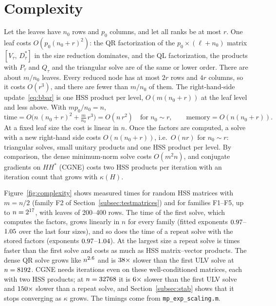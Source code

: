 \section{Complexity}\label{sec:complexity}
Let the leaves have $n_0$ rows and $p_0$ columns, and let all ranks be at most $r$. One leaf costs
$O(p_0(n_0+r)^2)$: the QR factorization of the $p_0\times(\ell+n_0)$ matrix $[V_\tau,\,D_\tau^*]$ in the
size reduction dominates, and the QL factorization, the products with $P_\tau$ and $Q_\tau$ and the
triangular solve are of the same or lower order. There are about $m/n_0$ leaves. Every reduced node has
at most $2r$ rows and $4r$ columns, so it costs $O(r^3)$, and there are fewer than $m/n_0$ of them.
The right-hand-side update~\eqref{eq:bbar} is one HSS product per level, $O(m(n_0+r))$ at the leaf level
and less above. With $mp_0/n_0=n$,
\[
\text{time}=O\!\Big(n\,(n_0+r)^2+\tfrac{m}{n_0}\,r^3\Big)=O(n\,r^2)\quad\text{for }n_0\sim r,
\qquad \text{memory}=O(n(n_0+r)).
\]
At a fixed leaf size the cost is linear in $n$. Once the factors are computed, a solve with a new
right-hand side costs $O(n(n_0+r))$, i.e.\ $O(nr)$ for $n_0\sim r$: triangular solves, small unitary
products and one HSS product per level. By comparison, the dense minimum-norm solve costs $O(m^2n)$,
and conjugate gradients on $HH^*$ (CGNE) costs two HSS products per iteration with an iteration count
that grows with $\kappa(H)$.

Figure~\ref{fig:complexity} shows measured times for random HSS matrices with $m=n/2$ (family F2 of
Section~\ref{subsec:testmatrices}) and for families F1--F5, up to $n=2^{17}$, with leaves of 200--400
rows. The time of the first solve, which computes the factors, grows linearly
in $n$ for every family (fitted exponents $0.97$--$1.05$ over the last four sizes), and so
does the time of a repeat solve with the stored factors (exponents
$0.97$--$1.04$). At the largest size a repeat solve is \EfourRatioRepeat{}
times faster than the first solve and costs as much as \EfourRepeatMatvec{} HSS matrix--vector products.
The dense QR solve grows like $n^{2.6}$ and is $38\times$ slower than the first ULV
solve at $n=8192$. CGNE needs \EfourCgIts{} iterations even on these well-conditioned matrices, each
with two HSS products; at $n=32768$ it is $6\times$ slower than the first ULV solve and
$150\times$ slower than a repeat solve, and Section~\ref{subsec:stab} shows that it stops
converging as $\kappa$ grows. The timings come from
\texttt{mp\_exp\_scaling.m}.

